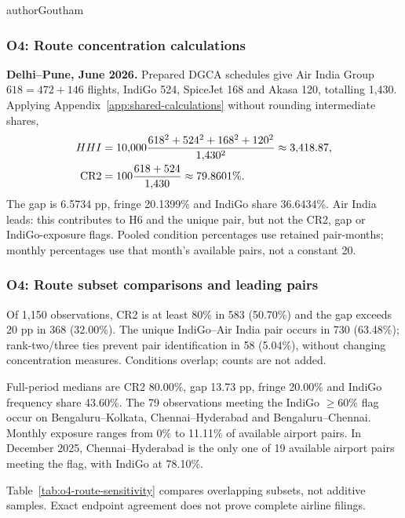 \begin{mergedcontribution}{authorGoutham}
\subsubsection{O4: Route concentration calculations}
\label{app:o4-route-calculations}
\textbf{Delhi--Pune, June 2026.} Prepared DGCA schedules give Air India Group $618=472+146$ flights, IndiGo 524, SpiceJet 168 and Akasa 120, totalling 1,430. Applying Appendix~\ref{app:shared-calculations} without rounding intermediate shares,
\[
\begin{aligned}
HHI&=10{,}000\frac{618^2+524^2+168^2+120^2}{1{,}430^2}\approx3{,}418.87,\\
\mathrm{CR2}&=100\frac{618+524}{1{,}430}\approx79.8601\%.
\end{aligned}
\]
The gap is 6.5734 pp, fringe 20.1399\% and IndiGo share 36.6434\%. Air India leads: this contributes to H6 and the unique pair, but not the CR2, gap or IndiGo-exposure flags. Pooled condition percentages use retained pair-months; monthly percentages use that month's available pairs, not a constant 20.

\subsubsection{O4: Route subset comparisons and leading pairs}
\label{app:o4-route-checks}
Of 1,150 observations, CR2 is at least 80\% in 583 (50.70\%) and the gap exceeds 20 pp in 368 (32.00\%). The unique IndiGo--Air India pair occurs in 730 (63.48\%); rank-two/three ties prevent pair identification in 58 (5.04\%), without changing concentration measures. Conditions overlap; counts are not added.

Full-period medians are CR2 80.00\%, gap 13.73 pp, fringe 20.00\% and IndiGo frequency share 43.60\%. The 79 observations meeting the IndiGo $\geq60\%$ flag occur on Bengaluru--Kolkata, Chennai--Hyderabad and Bengaluru--Chennai. Monthly exposure ranges from 0\% to 11.11\% of available airport pairs. In December 2025, Chennai--Hyderabad is the only one of 19 available airport pairs meeting the flag, with IndiGo at 78.10\%.

Table~\ref{tab:o4-route-sensitivity} compares overlapping subsets, not additive samples. Exact endpoint agreement does not prove complete airline filings.


\end{mergedcontribution}
